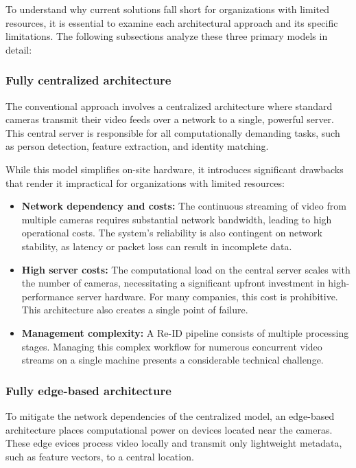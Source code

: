 \documentclass[../main.tex]{subfiles}
\begin{document}
To understand why current solutions fall short for organizations with limited resources, it is essential to examine each architectural approach and its specific limitations. The following subsections analyze these three primary models in detail:

\subsubsection{Fully centralized architecture}
The conventional approach involves a centralized architecture where standard cameras transmit their video feeds over a network to a single, powerful server. This central server is responsible for all computationally demanding tasks, such as person detection, feature extraction, and identity matching.

While this model simplifies on-site hardware, it introduces significant drawbacks that render it impractical for organizations with limited resources:
\begin{itemize}
    \item \textbf{Network dependency and costs:} The continuous streaming of video from multiple cameras requires substantial network bandwidth, leading to high operational costs. The system's reliability is also contingent on network stability, as latency or packet loss can result in incomplete data.
    \item \textbf{High server costs:} The computational load on the central server scales with the number of cameras, necessitating a significant upfront investment in high-performance server hardware. For many companies, this cost is prohibitive. This architecture also creates a single point of failure.
    \item \textbf{Management complexity:} A Re-ID pipeline consists of multiple processing stages. Managing this complex workflow for numerous concurrent video streams on a single machine presents a considerable technical challenge.
\end{itemize}

\subsubsection{Fully edge-based architecture}
To mitigate the network dependencies of the centralized model, an edge-based architecture places computational power on devices located near the cameras. These edge evices process video locally and transmit only lightweight metadata, such as feature vectors, to a central location.
\end{document}
